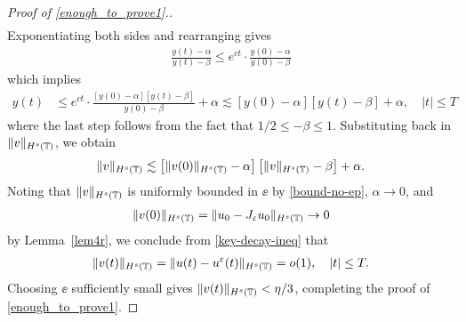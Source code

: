 \begin{proof}[Proof of \eqref{enough_to_prove1}.]
\begin{equation*}
\begin{split}
	\end{split}
\end{equation*}
%
%
Exponentiating both sides and rearranging gives
%
%
\begin{equation*}
	\begin{split}
		\frac{y(t) - \alpha}{y(t) - \beta} \le e^{ct} \cdot
		\frac{y(0) - \alpha}{y(0) - \beta}	
	\end{split}
\end{equation*}
%
%
which implies
%
%
\begin{equation*}
	\begin{split}
		y(t) 
		& \le e^{ct} \cdot \frac{\left [y(0) - \alpha \right ]
		\left [y(t) - \beta \right ]}{y(0) - 
		\beta} + \alpha
		 \lesssim \left [y(0) - \alpha \right ] \left [y(t) - \beta \right ] + \alpha, \quad |t| \le T
	\end{split}
\end{equation*}
%
%
where the last step follows from the fact that $1/2 \le -\beta \le 1$.  Substituting back in $\|v\|_{H^s(\mathbb{T})}$, we obtain
\begin{equation}
	\label{key-decay-ineq}
	\begin{split}
		\|v\|_{H^s(\mathbb{T})}  \lesssim \left [\|v(0)\|_{H^s(\mathbb{T})} - 
		\alpha \right ] \left [\|v\|_{H^s(\mathbb{T})} - \beta \right ] + \alpha.
	\end{split}
\end{equation}
Noting that $\|v\|_{H^s(\mathbb{T})}$ is uniformly bounded in $\ee$ by 
\eqref{bound-no-ep}, $\alpha \to 0$, and
%
%
\begin{equation*}
\label{303''qx}
\begin{split}
\|v(0)\|_{H^s(\mathbb{T})} = \|u_0 - J_\varepsilon u_0 \|_{H^s(\mathbb{T})} \to 0 \end{split}
\end{equation*}
by  Lemma~\ref{lem4r}, we conclude from \eqref{key-decay-ineq} that
%
%
\begin{equation}
\label{304qx}
\begin{split}
\|v(t)\|_{H^s(\mathbb{T})} = 
\|u(t) - u^\varepsilon(t) \|_{H^s(\mathbb{T})}= o(1), \quad |t| \le T.
\end{split}
\end{equation}
%
%
Choosing $\ee$ sufficiently small gives $\|v(t)\|_{H^s(\mathbb{T})} < \eta/3$, 
completing the proof of \eqref{enough_to_prove1}. 
\end{proof}
%
%
%
%
%
%
